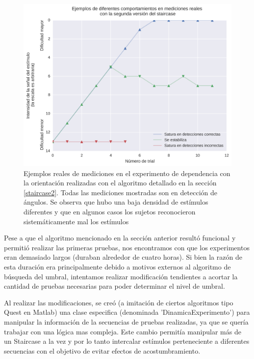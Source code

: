 \documentclass{article}
\numberwithin{figure}{section}
\begin{document}
    \begin{figure}
        \center
        \includegraphics[width=\textwidth]{Imagenes/StairCase2.png}
        \caption{Ejemplos reales de mediciones en el experimento de dependencia con la orientación realizadas con el algoritmo detallado en la sección \ref{staircase2}. Todas las mediciones mostradas son en detección de ángulos. Se observa que hubo una baja densidad de estímulos diferentes y que en algunos casos los sujetos reconocieron sistemáticamente mal los estímulos}
        \label{fig:staircase2}
    \end{figure}  
    
    Pese a que el algoritmo mencionado en la sección anterior resultó funcional y permitió realizar las primeras pruebas, nos encontramos con que los experimentos eran demasiado largos (duraban alrededor de cuatro horas). Si bien la razón de esta duración era principalmente debido a motivos externos al algoritmo de búsqueda del umbral, intentamos realizar modificación tendientes a acortar la cantidad de pruebas necesarias para poder determinar el nivel de umbral. 
    
    Al realizar las modificaciones, se creó (a imitación de ciertos algoritmos tipo Quest en Matlab) una clase especifica (denominada 'DinamicaExperimento') para manipular la información de la secuencias de pruebas realizadas, ya que se quería trabajar con una lógica mas compleja. Este cambio permitía manipular más de un Staircase a la vez y por lo tanto intercalar estímulos perteneciente a diferentes secuencias con el objetivo de evitar efectos de acostumbramiento. 
    
\end{document}
